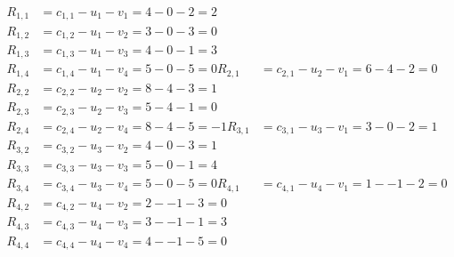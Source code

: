 \[
\begin{aligned}
R_{1,1} &= c_{1,1} - u_{1} - v_{1} = 4 - 0 - 2 = 2 \\
R_{1,2} &= c_{1,2} - u_{1} - v_{2} = 3 - 0 - 3 = 0 \\
R_{1,3} &= c_{1,3} - u_{1} - v_{3} = 4 - 0 - 1 = 3 \\
R_{1,4} &= c_{1,4} - u_{1} - v_{4} = 5 - 0 - 5 = 0 
R_{2,1} &= c_{2,1} - u_{2} - v_{1} = 6 - 4 - 2 = 0 \\
R_{2,2} &= c_{2,2} - u_{2} - v_{2} = 8 - 4 - 3 = 1 \\
R_{2,3} &= c_{2,3} - u_{2} - v_{3} = 5 - 4 - 1 = 0 \\
R_{2,4} &= c_{2,4} - u_{2} - v_{4} = 8 - 4 - 5 = -1 
R_{3,1} &= c_{3,1} - u_{3} - v_{1} = 3 - 0 - 2 = 1 \\
R_{3,2} &= c_{3,2} - u_{3} - v_{2} = 4 - 0 - 3 = 1 \\
R_{3,3} &= c_{3,3} - u_{3} - v_{3} = 5 - 0 - 1 = 4 \\
R_{3,4} &= c_{3,4} - u_{3} - v_{4} = 5 - 0 - 5 = 0 
R_{4,1} &= c_{4,1} - u_{4} - v_{1} = 1 - -1 - 2 = 0 \\
R_{4,2} &= c_{4,2} - u_{4} - v_{2} = 2 - -1 - 3 = 0 \\
R_{4,3} &= c_{4,3} - u_{4} - v_{3} = 3 - -1 - 1 = 3 \\
R_{4,4} &= c_{4,4} - u_{4} - v_{4} = 4 - -1 - 5 = 0 
\end{aligned}
\]

